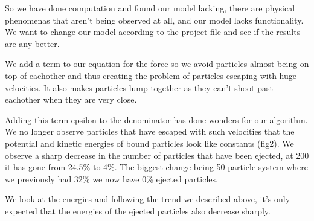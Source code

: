 \documentclass{article}
\begin{document}

So we have done computation and found our model lacking, there are physical
phenomenas that aren't being observed at all, and our model lacks functionality.
We want to change our model according to the project file and see if the results
are any better.

We add a term to our equation for the force so we avoid particles
almost being on top of eachother and thus creating the problem of 
particles escaping with huge velocities. It also makes particles lump together
as they can't shoot past eachother when they are very close.

Adding this term epsilon to the denominator has done wonders for our algorithm.
We no longer observe particles that have escaped with such velocities
that the potential and kinetic energies of bound particles look
like constants (fig2). We observe a sharp decrease in the number of particles that
have been ejected, at 200 it has gone from 24.5\% to 4\%. The biggest change being
50 particle system where we previously had 32\% we now have 0\% ejected particles.

We look at the energies and following the trend we described above, it's only
expected that the energies of the ejected particles also decrease sharply.
\end{document}
